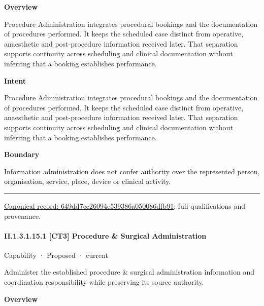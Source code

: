 \textbf{Overview}



Procedure Administration integrates procedural bookings and the documentation of procedures performed. It keeps the scheduled case distinct from operative, anaesthetic and post-procedure information received later. That separation supports continuity across scheduling and clinical documentation without inferring that a booking establishes performance.



\textbf{Intent}



Procedure Administration integrates procedural bookings and the documentation of procedures performed. It keeps the scheduled case distinct from operative, anaesthetic and post-procedure information received later. That separation supports continuity across scheduling and clinical documentation without inferring that a booking establishes performance.



\textbf{Boundary}



Information administration does not confer authority over the represented person, organisation, service, place, device or clinical activity.



\medskip\hrule\medskip

{\footnotesize \href{../../../../continuum/strategy/capability/649dd7cc26094e539386a050086dfb91.md}{Canonical record: 649dd7cc26094e539386a050086dfb91}; full qualifications and provenance.}\par
\paragraph*{II.1.3.1.15.1 [CT3] Procedure \& Surgical Administration}
\label{navigation:II.1.3.1.15.1}

\label{element:3c4a53dd8c8f468f83ca5d92397dd7e8}
{\small Capability · Proposed · current}\par

Administer the established procedure \& surgical administration information and coordination responsibility while preserving its source authority.



\textbf{Overview}



